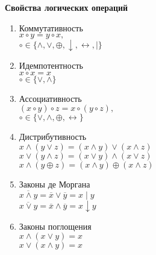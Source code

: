     \begin{minipage}[t]{0.5\textwidth}
        \centering
        \textbf{Свойства логических операций}
        \begin{enumerate}
            \item Коммутативность\\
            $x \circ y = y \circ x,$\\
            $\circ \in \{\wedge, \vee, \oplus, \downarrow, \leftrightarrow, | \}$

            \item Идемпотентность\\
            $x \circ x = x$\\
            $\circ \in \{\vee, \wedge \}$

            \item Ассоциативность\\
            $(x \circ y) \circ z = x \circ (y \circ z),$\\
            $\circ \in \{\vee, \wedge, \oplus, \leftrightarrow \}$\\

            \item Дистрибутивность\\
            $x \wedge (y \vee z) = (x \wedge y) \vee (x \wedge z)$\\
            $x \vee (y \wedge z) = (x \vee y) \wedge (x \vee z)$\\
            $x \wedge (y \oplus z) = (x \wedge y) \oplus (x \wedge z)$

            \item Законы де Моргана\\
            $\overline{x \wedge y} = \overline x \vee \overline y = x \mid y$\\
            $\overline{x \vee y} = \overline x \wedge \overline y = x \downarrow y$

            \item Законы поглощения\\
            $x \wedge (x \vee y) = x$\\
            $x \vee (x \wedge y) = x$


\end{enumerate}
\end{minipage}
